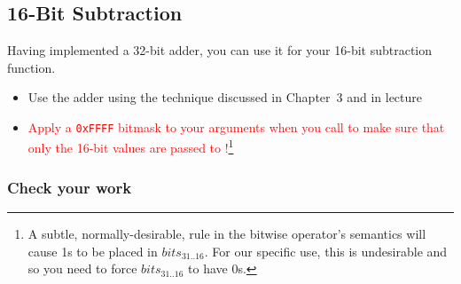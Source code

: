 \subsection{16-Bit Subtraction}

Having implemented a 32-bit adder, you can use it for your 16-bit subtraction function.

\begin{description}
        \begin{itemize}
            \item Use the adder using the technique discussed in Chapter~3 and in lecture
            \item \textcolor{red}{Apply a \texttt{0xFFFF} bitmask to your arguments when you call  to make sure that only the 16-bit values are passed to !}\footnote{
                A subtle, normally-desirable, rule in the bitwise operator's semantics will cause 1s to be placed in $bits_{31..16}$.
                For our specific use, this is undesirable and so you need to force $bits_{31..16}$ to have 0s.
            }
        \end{itemize}
\end{description}


\subsubsection*{Check your work}

